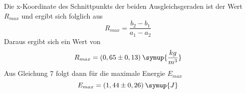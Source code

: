 Die x-Koordinate des Schnittpunkts der beiden Ausgleichsgeraden ist der Wert $R_{max}$ und ergibt
sich folglich aus
\begin{equation*}
  R_{max} = \frac{b_2 - b_1}{a_1 - a_2}
\end{equation*}
Daraus ergibt sich ein Wert von
\begin{equation*}
  R_{max} = (0,65 \pm 0,13) \: \symup{\frac{kg}{m^3}}
\end{equation*}
Aus Gleichung 7 folgt dann für die maximale Energie $E_{max}$
\begin{equation*}
  E_{max} = (1,44 \pm 0,26) \: \symup{J}
\end{equation*}
